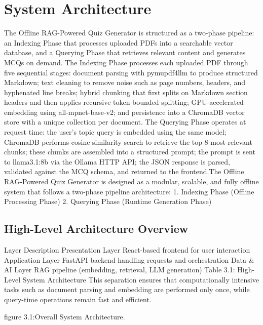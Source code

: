 \documentclass[12pt,a4paper]{report}
\begin{document}
\section{System Architecture}
The Offline RAG-Powered Quiz Generator is structured as a two-phase pipeline: an Indexing Phase that processes uploaded PDFs into a searchable vector database, and a Querying Phase that retrieves relevant content and generates MCQs on demand.
The Indexing Phase processes each uploaded PDF through five sequential stages: document parsing with pymupdf4llm to produce structured Markdown; text cleaning to remove noise such as page numbers, headers, and hyphenated line breaks; hybrid chunking that first splits on Markdown section headers and then applies recursive token-bounded splitting; GPU-accelerated embedding using all-mpnet-base-v2; and persistence into a ChromaDB vector store with a unique collection per document.
The Querying Phase operates at request time: the user's topic query is embedded using the same model; ChromaDB performs cosine similarity search to retrieve the top-8 most relevant chunks; these chunks are assembled into a structured prompt; the prompt is sent to llama3.1:8b via the Ollama HTTP API; the JSON response is parsed, validated against the MCQ schema, and returned to the frontend.The Offline RAG-Powered Quiz Generator is designed as a modular, scalable, and fully offline system that follows a two-phase pipeline architecture:
1. Indexing Phase (Offline Processing Phase)
2. Querying Phase (Runtime Generation Phase)
\subsection{High-Level Architecture Overview}
Layer
Description
Presentation Layer
React-based frontend for user interaction
Application Layer
FastAPI backend handling requests and orchestration
Data \& AI Layer
RAG pipeline (embedding, retrieval, LLM generation)
Table  3.1: High-Level System Architecture
This separation ensures that computationally intensive tasks such as document parsing and embedding are performed only once, while query-time operations remain fast and efficient.


figure 3.1:Overall System Architecture.
\end{document}
